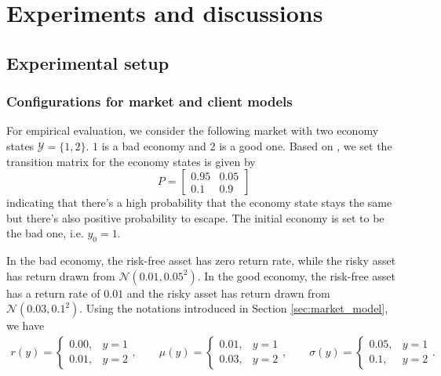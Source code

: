\chapter{Experiments and discussions}\label{sec:exp}
\section{Experimental setup}\label{sec:setup}

\subsection{Configurations for market and client models}
For empirical evaluation, we consider the following market with two economy states $\mathcal Y=\{1,2\}$. $1$ is a bad economy and $2$ is a good one. Based on , we set the transition matrix for the economy states is given by $$P=\begin{bmatrix}
0.95 & 0.05\\
0.1 & 0.9
\end{bmatrix}$$ indicating that there's a high probability that the economy state stays the same but there's also positive probability to escape. The initial economy is set to be the bad one, i.e. $y_0=1$.

In the bad economy, the risk-free asset has zero return rate, while the risky asset has return drawn from $\mathcal N(0.01,0.05^2)$. In the good economy, the risk-free asset has a return rate of $0.01$ and the risky asset has return drawn from $\mathcal N(0.03, 0.1^2)$. Using the notations introduced in Section \ref{sec:market_model}, we have
    \begin{align*}
    r(y)=\begin{cases}0.00,&y=1\\
    0.01, & y=2
    \end{cases},\qquad
    \mu(y)=\begin{cases}0.01,&y=1\\
    0.03, & y=2
    \end{cases},\qquad
    \sigma(y)=\begin{cases}0.05,&y=1\\
    0.1, & y=2
    \end{cases}.\qquad
    \end{align*}

